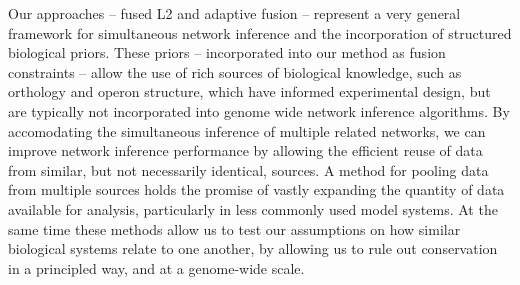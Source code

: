 \documentclass[11pt]{article}
\begin{document}
Our approaches -- fused L2 and adaptive fusion -- represent a very general framework for simultaneous network inference and the incorporation of structured biological priors. These priors -- incorporated into our method as fusion constraints -- allow the use of rich sources of biological knowledge, such as orthology and operon structure, which have informed experimental design, but are typically not incorporated into genome wide network inference algorithms. By accomodating the simultaneous inference of multiple related networks, we can improve network inference performance by allowing the efficient reuse of data from similar, but not necessarily identical, sources. A method for pooling data from multiple sources holds the promise of vastly expanding the quantity of data available for analysis, particularly in less commonly used model systems. At the same time these methods allow us to test our assumptions on how similar biological systems relate to one another, by allowing us to rule out conservation in a principled way, and at a genome-wide scale. 






\end{document}
